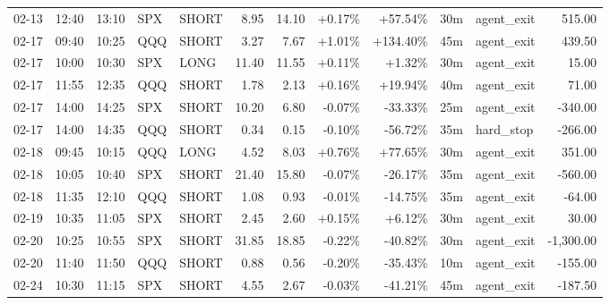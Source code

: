 \documentclass[11pt,a4paper,twoside]{article}
\begin{document}
\begin{center}
\begin{longtable}{>{\color{txtmain}}l l l l l r r r r r >{\color{txtmain}}l r}
02-13 & 12:40 & 13:10 & SPX & SHORT & 8.95 & 14.10 & \textcolor{wingreen}{+0.17\%} & \textcolor{wingreen}{+57.54\%} & 30m & agent\_exit & \textcolor{wingreen}{515.00} \\
02-17 & 09:40 & 10:25 & QQQ & SHORT & 3.27 & 7.67 & \textcolor{wingreen}{+1.01\%} & \textcolor{wingreen}{+134.40\%} & 45m & agent\_exit & \textcolor{wingreen}{439.50} \\
02-17 & 10:00 & 10:30 & SPX & LONG & 11.40 & 11.55 & \textcolor{wingreen}{+0.11\%} & \textcolor{wingreen}{+1.32\%} & 30m & agent\_exit & \textcolor{wingreen}{15.00} \\
02-17 & 11:55 & 12:35 & QQQ & SHORT & 1.78 & 2.13 & \textcolor{wingreen}{+0.16\%} & \textcolor{wingreen}{+19.94\%} & 40m & agent\_exit & \textcolor{wingreen}{71.00} \\
02-17 & 14:00 & 14:25 & SPX & SHORT & 10.20 & 6.80 & \textcolor{lossred}{-0.07\%} & \textcolor{lossred}{-33.33\%} & 25m & agent\_exit & \textcolor{lossred}{-340.00} \\
02-17 & 14:00 & 14:35 & QQQ & SHORT & 0.34 & 0.15 & \textcolor{lossred}{-0.10\%} & \textcolor{lossred}{-56.72\%} & 35m & hard\_stop & \textcolor{lossred}{-266.00} \\
02-18 & 09:45 & 10:15 & QQQ & LONG & 4.52 & 8.03 & \textcolor{wingreen}{+0.76\%} & \textcolor{wingreen}{+77.65\%} & 30m & agent\_exit & \textcolor{wingreen}{351.00} \\
02-18 & 10:05 & 10:40 & SPX & SHORT & 21.40 & 15.80 & \textcolor{lossred}{-0.07\%} & \textcolor{lossred}{-26.17\%} & 35m & agent\_exit & \textcolor{lossred}{-560.00} \\
02-18 & 11:35 & 12:10 & QQQ & SHORT & 1.08 & 0.93 & \textcolor{lossred}{-0.01\%} & \textcolor{lossred}{-14.75\%} & 35m & agent\_exit & \textcolor{lossred}{-64.00} \\
02-19 & 10:35 & 11:05 & SPX & SHORT & 2.45 & 2.60 & \textcolor{wingreen}{+0.15\%} & \textcolor{wingreen}{+6.12\%} & 30m & agent\_exit & \textcolor{wingreen}{30.00} \\
02-20 & 10:25 & 10:55 & SPX & SHORT & 31.85 & 18.85 & \textcolor{lossred}{-0.22\%} & \textcolor{lossred}{-40.82\%} & 30m & agent\_exit & \textcolor{lossred}{-1,300.00} \\
02-20 & 11:40 & 11:50 & QQQ & SHORT & 0.88 & 0.56 & \textcolor{lossred}{-0.20\%} & \textcolor{lossred}{-35.43\%} & 10m & agent\_exit & \textcolor{lossred}{-155.00} \\
02-24 & 10:30 & 11:15 & SPX & SHORT & 4.55 & 2.67 & \textcolor{lossred}{-0.03\%} & \textcolor{lossred}{-41.21\%} & 45m & agent\_exit & \textcolor{lossred}{-187.50} \\

\end{longtable}
\end{center}
\end{document}
